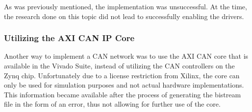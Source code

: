 As was previously mentioned, the implementation was unsuccessful. At the time, the research done on this topic did not lead to successfully enabling the drivers.

\subsubsection*{Utilizing the AXI CAN IP Core}

Another way to implement a CAN network was to use the AXI CAN core that is available in the Vivado Suite, instead of utilizing the CAN controllers on the Zynq chip.
Unfortunately due to a license restriction from Xilinx, the core can only be used for simulation purposes and not actual hardware implementations.
This information became available after the process of generating the bistream file in the form of an error, thus not allowing for further use of the core.

